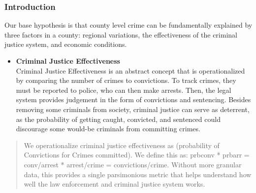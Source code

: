 \documentclass[]{article}
\newenvironment{Shaded}{}{}
\newcommand{\NormalTok}[1]{#1}
\newcommand{\OperatorTok}[1]{#1}
\newcommand{\StringTok}[1]{\textcolor[rgb]{0.00,0.50,0.50}{#1}}
\providecommand{\tightlist}{%
  \setlength{\itemsep}{0pt}\setlength{\parskip}{0pt}}
\begin{document}
\hypertarget{introduction-1}{%
\subsubsection{Introduction}\label{introduction-1}}

Our base hypothesis is that county level crime can be fundamentally
explained by three factors in a county: regional variations, the
effectiveness of the criminal justice system, and economic conditions.

\begin{itemize}
\tightlist
\item
  \textbf{Criminal Justice Effectiveness}\\
  Criminal Justice Effectiveness is an abstract concept that is
  operationalized by comparing the number of crimes to convictions. To
  track crimes, they must be reported to police, who can then make
  arrests. Then, the legal system provides judgement in the form of
  convictions and sentencing. Besides removing some criminals from
  society, criminal justice can serve as deterrent, as the probability
  of getting caught, convicted, and sentenced could discourage some
  would-be criminals from committing crimes.
\end{itemize}

\begin{quote}
We operationalize criminal justice effectiveness as (probability of
Convictions for Crimes committed). We define this as: prbconv * prbarr =
conv/arrest * arrest/crime = convictions/crime. Without more granular
data, this provides a single parsimonious metric that helps understand
how well the law enforcement and criminal justice system works.
\end{quote}

\begin{Shaded}
\end{Shaded}
\end{document}
